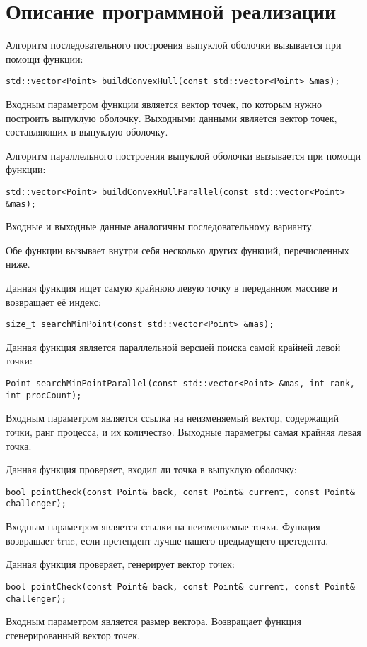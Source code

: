 \documentclass{report}
\begin{document}
\section*{Описание программной реализации}
Алгоритм последовательного построения выпуклой оболочки вызывается при помощи функции:
\begin{lstlisting}
std::vector<Point> buildConvexHull(const std::vector<Point> &mas);
\end{lstlisting}
\par Входным параметром функции является вектор точек, по которым нужно построить выпуклую оболочку. Выходными данными является вектор точек, составляющих в выпуклую оболочку.
\par Алгоритм параллельного построения выпуклой оболочки вызывается при помощи функции:
\begin{lstlisting}
std::vector<Point> buildConvexHullParallel(const std::vector<Point> &mas);
\end{lstlisting}
\par Входные и выходные данные аналогичны последовательному варианту.
\par Обе функции вызывает внутри себя несколько других функций, перечисленных ниже.
\par Данная функция ищет самую крайнюю левую точку в переданном массиве и возвращает её индекс:
\begin{lstlisting}
size_t searchMinPoint(const std::vector<Point> &mas);
\end{lstlisting}
\par Данная функция является параллельной версией поиска самой крайней левой точки:
\begin{lstlisting}
Point searchMinPointParallel(const std::vector<Point> &mas, int rank, int procCount);
\end{lstlisting}
\par Входным параметром является ссылка на неизменяемый вектор, содержащий точки, ранг процесса, и их количество. Выходные параметры самая крайняя левая точка.
\par Данная функция проверяет, входил ли точка в выпуклую оболочку:
\begin{lstlisting}
bool pointCheck(const Point& back, const Point& current, const Point& challenger);
\end{lstlisting}
\par Входным параметром является ссылки на неизменяемые точки. Функция возврашает true, если претендент лучше нашего предыдущего претедента.
\par Данная функция проверяет, генерирует вектор точек:
\begin{lstlisting}
bool pointCheck(const Point& back, const Point& current, const Point& challenger);
\end{lstlisting}
\par Входным параметром является размер вектора. Возвращает функция сгенерированный вектор точек.
\newpage
\end{document}
